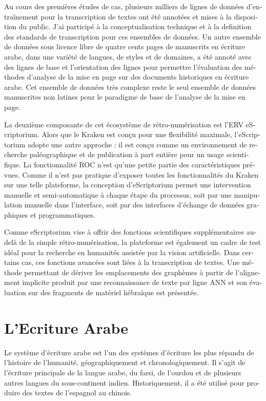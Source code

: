 \begin{french}
Au cours des premières études de cas, plusieurs milliers de lignes de données
d'entraînement pour la transcription de textes ont été annotées et mises à la
disposition du public. J'ai participé à la conceptualisation technique et à la definition des
standards de transcription pour ces ensembles de données. Un autre ensemble de
données sous licence libre de quatre cents pages de manuscrits en écriture
arabe, dans une variété de langues, de styles et de domaines, a été annoté avec
des lignes de base et l'orientation des lignes pour permettre l'évaluation des
méthodes d'analyse de la mise en page sur des documents historiques en écriture
arabe.  Cet ensemble de données très complexe reste le seul ensemble de données
manuscrites non latines pour le paradigme de base de l'analyse de la mise en
page.

La deuxième composante de cet écosystème de rétro-numérisation est l'ERV
eScriptorium.  Alors que le Kraken est conçu pour une flexibilité maximale,
l'eScriptorium adopte une autre approche : il est conçu comme un environnement de
recherche paléographique et de publication à part entière pour un usage
scientifique. La fonctionnalité ROC n'est qu'une petite partie des
caractéristiques prévues. Comme il n'est pas pratique d'exposer toutes les
fonctionnalités du Kraken sur une telle plateforme, la conception
d'eScriptorium permet une intervention manuelle et semi-automatique à chaque
étape du processus, soit par une manipulation manuelle dans l'interface, soit
par des interfaces d'échange de données graphiques et programmatiques.

Comme eScriptorium vise à offrir des fonctions scientifiques supplémentaires
au-delà de la simple rétro-numérisation, la plateforme est également un cadre
de test idéal pour la recherche en humanités assistée par la vision
artificielle. Dans certains cas, ces fonctions avancées sont liées à la
transcription de textes. Une méthode permettant de dériver les emplacements des
graphèmes à partir de l'alignement implicite produit par une reconnaissance de
texte par ligne ANN et son évaluation sur des fragments de matériel hébraïque
est présentée.

\section{L'Ecriture Arabe}

Le système d'écriture arabe est l'un des systèmes d'écriture les plus répandu
de l'histoire de l'humanité, géographiquement et chronologiquement. Il s'agit
de l'écriture principale de la langue arabe, du farsi, de l'ourdou et de
plusieurs autres langues du sous-continent indien. Historiquement, il a été
utilisé pour produire des textes de l'espagnol au chinois.


\end{french}
